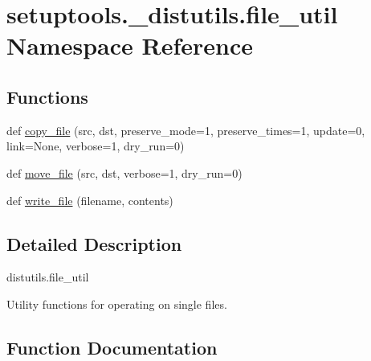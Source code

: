 \hypertarget{namespacesetuptools_1_1__distutils_1_1file__util}{}\section{setuptools.\+\_\+distutils.\+file\+\_\+util Namespace Reference}
\label{namespacesetuptools_1_1__distutils_1_1file__util}
\subsection*{Functions}
\begin{DoxyCompactItemize}
\item 
def \hyperlink{namespacesetuptools_1_1__distutils_1_1file__util_ad2bdd3176e776e490badca34a1056a46}{copy\+\_\+file} (src, dst, preserve\+\_\+mode=1, preserve\+\_\+times=1, update=0, link=None, verbose=1, dry\+\_\+run=0)
\item 
def \hyperlink{namespacesetuptools_1_1__distutils_1_1file__util_ad239e74ae79729a1aa85caf53617796c}{move\+\_\+file} (src, dst, verbose=1, dry\+\_\+run=0)
\item 
def \hyperlink{namespacesetuptools_1_1__distutils_1_1file__util_adcd060df375bd14841dc01abfa7afcd5}{write\+\_\+file} (filename, contents)
\end{DoxyCompactItemize}


\subsection{Detailed Description}
\begin{DoxyVerb}distutils.file_util

Utility functions for operating on single files.
\end{DoxyVerb}
 

\subsection{Function Documentation}
\mbox{\label{namespacesetuptools_1_1__distutils_1_1file__util_ad2bdd3176e776e490badca34a1056a46}} 
